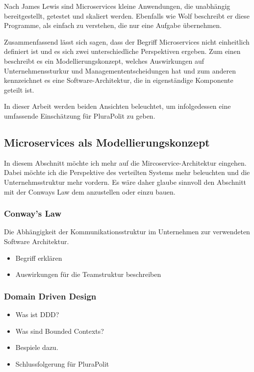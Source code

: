 Nach James Lewis sind Microservices kleine Anwendungen, die unabhängig bereitgestellt, getestet und skaliert werden. Ebenfalls wie Wolf beschreibt er diese Programme, als einfach zu verstehen, die nur eine Aufgabe übernehmen.

Zusammenfassend lässt sich sagen, dass der Begriff Microservices nicht einheitlich definiert ist und es sich zwei unterschiedliche Perspektiven ergeben. Zum einen beschreibt es ein Modellierungskonzept, welches Auswirkungen auf Unternehmenssturkur und Managemententscheidungen hat und zum anderen kennzeichnet es eine Software-Architektur, die in eigenständige Komponente geteilt ist.

In dieser Arbeit werden beiden Ansichten beleuchtet, um infolgedessen eine umfassende Einschätzung für PluraPolit zu geben.

\subsection{Microservices als Modellierungskonzept}

In diesem Abschnitt möchte ich mehr auf die Mircoservice-Architektur eingehen. Dabei möchte ich die Perspektive des verteilten Systems mehr beleuchten und die Unternehmsstruktur mehr vordern. Es wäre daher glaube sinnvoll den Abschnitt mit der Conways Law dem anzustellen oder einzu bauen.

\subsubsection{Conway's Law}

Die Abhängigkeit der Kommunikationsstruktur im Unternehmen zur verwendeten Software Architektur.

\begin{itemize}
	\item Begriff erklären
	\item Auswirkungen für die Teamstruktur beschreiben
\end{itemize}

\subsubsection{Domain Driven Design}

\begin{itemize}
	\item Was ist DDD?
	\item Was sind Bounded Contexts?
	\item 	Bespiele dazu.
	\item Schlussfolgerung für PluraPolit
\end{itemize}

